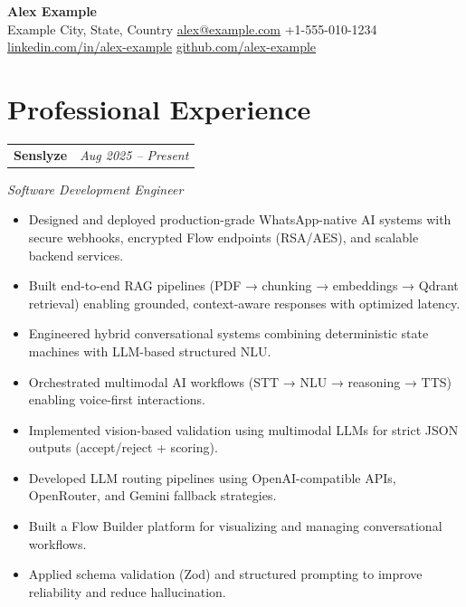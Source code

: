 \documentclass[a4paper,10pt]{article}
\begin{document}
\begin{center}
  {\LARGE \textbf{Alex Example}} \\[4pt]
  {\small
    Example City, State, Country \quad\textbar\quad
    \href{mailto:alex@example.com}{alex@example.com} \quad\textbar\quad
    +1-555-010-1234 \\[2pt]
    \href{https://www.linkedin.com/in/alex-example}{linkedin.com/in/alex-example} \quad\textbar\quad
    \href{https://github.com/alex-example}{github.com/alex-example}
  }
\end{center}




\section*{Professional Experience}

\noindent
\begin{tabularx}{\textwidth}{@{}X r@{}}
  \textbf{Senslyze} & \textit{Aug 2025 – Present}
\end{tabularx}
\textit{Software Development Engineer}

\begin{itemize}
  \item Designed and deployed production-grade WhatsApp-native AI systems with secure webhooks, encrypted Flow endpoints (RSA/AES), and scalable backend services.
  \item Built end-to-end RAG pipelines (PDF → chunking → embeddings → Qdrant retrieval) enabling grounded, context-aware responses with optimized latency.
  \item Engineered hybrid conversational systems combining deterministic state machines with LLM-based structured NLU.
  \item Orchestrated multimodal AI workflows (STT → NLU → reasoning → TTS) enabling voice-first interactions.
  \item Implemented vision-based validation using multimodal LLMs for strict JSON outputs (accept/reject + scoring).
  \item Developed LLM routing pipelines using OpenAI-compatible APIs, OpenRouter, and Gemini fallback strategies.
  \item Built a Flow Builder platform for visualizing and managing conversational workflows.
  \item Applied schema validation (Zod) and structured prompting to improve reliability and reduce hallucination.
\end{itemize}
\end{document}
